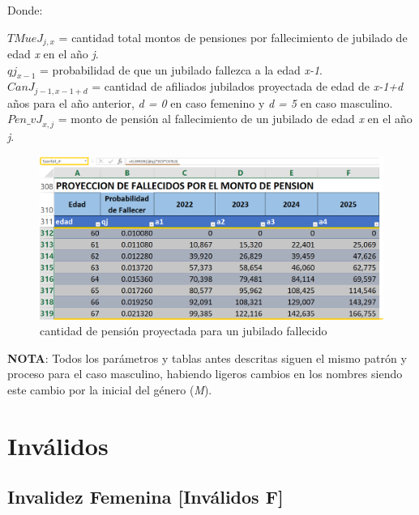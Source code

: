 \documentclass[
  letterpaper,
  DIV=11,
  numbers=noendperiod]{scrreprt}
\begin{document}
Donde:

\({TMueJ}_{j,x}\) = cantidad total montos de pensiones por fallecimiento
de jubilado de edad \emph{x} en el año \emph{j}.\\
\({qj}_{x-1}\) = probabilidad de que un jubilado fallezca a la edad
\emph{x-1}.\\
\(Ca{nJ}_{j-1,x-1+d}\) = cantidad de afiliados jubilados proyectada de
edad de \emph{x-1+d} años para el año anterior, \emph{d = 0} en caso
femenino y \emph{d = 5} en caso masculino.\\
\({Pen\_vJ}_{x,j}\) = monto de pensión al fallecimiento de un jubilado
de edad \emph{x} en el año \emph{j}.

\begin{figure}

{\centering \includegraphics{images/F/Img33.png}

}

\caption{cantidad de pensión proyectada para un jubilado fallecido}

\end{figure}

\textbf{NOTA}: Todos los parámetros y tablas antes descritas siguen el
mismo patrón y proceso para el caso masculino, habiendo ligeros cambios
en los nombres siendo este cambio por la inicial del género (\emph{M}).


\hypertarget{invuxe1lidos}{%
\chapter{Inválidos}\label{invuxe1lidos}}

\hypertarget{invalidez-femenina-invuxe1lidos-f}{%
\section{Invalidez Femenina {[}Inválidos
F{]}}\label{invalidez-femenina-invuxe1lidos-f}}
\end{document}
